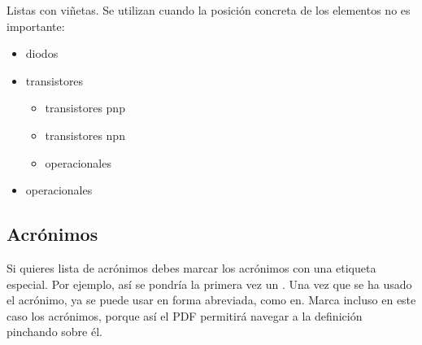 Listas con viñetas. Se utilizan cuando la posición concreta de los elementos no es importante:

\begin{itemize}
\item diodos
\item transistores
    \begin{itemize}
    \item transistores pnp
    \item transistores npn
    \item operacionales
    \end{itemize}
\item operacionales
\end{itemize}

\subsection{Acrónimos}

Si quieres lista de acrónimos debes marcar los acrónimos con una etiqueta especial.  Por ejemplo, así se pondría la primera vez un .  Una vez que se ha usado el acrónimo, ya se puede usar en forma abreviada, como en.  Marca incluso en este caso los acrónimos, porque así el PDF permitirá navegar a la definición pinchando sobre él.
